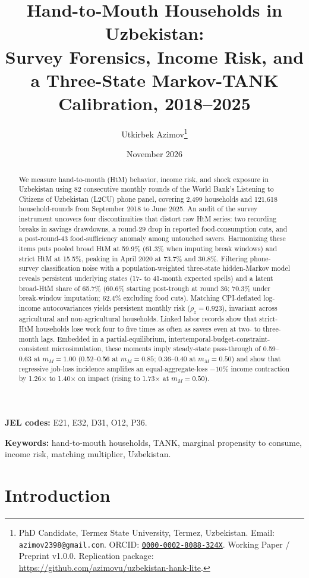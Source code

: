\documentclass[11pt]{article}
\title{Hand-to-Mouth Households in Uzbekistan:\\Survey Forensics, Income Risk, and a Three-State Markov-TANK Calibration, 2018--2025}
\author{Utkirbek Azimov\thanks{PhD Candidate, Termez State University, Termez, Uzbekistan. Email: \texttt{azimov2398@gmail.com}. ORCID: \href{https://orcid.org/0000-0002-8088-324X}{\texttt{0000-0002-8088-324X}}. Working Paper / Preprint v1.0.0. Replication package: \url{https://github.com/azimovu/uzbekistan-hank-lite}.}}
\date{November 2026}
\begin{document}
\maketitle
\vspace{-1.0em}

\begin{abstract}
We measure hand-to-mouth (HtM) behavior, income risk, and shock exposure in Uzbekistan using 82 consecutive monthly rounds of the World Bank's Listening to Citizens of Uzbekistan (L2CU) phone panel, covering 2,499 households and 121,618 household-rounds from September 2018 to June 2025. An audit of the survey instrument uncovers four discontinuities that distort raw HtM series: two recording breaks in savings drawdowns, a round-29 drop in reported food-consumption cuts, and a post-round-43 food-sufficiency anomaly among untouched savers. Harmonizing these items puts pooled broad HtM at 59.9\% (61.3\% when imputing break windows) and strict HtM at 15.5\%, peaking in April 2020 at 73.7\% and 30.8\%. Filtering phone-survey classification noise with a population-weighted three-state hidden-Markov model reveals persistent underlying states (17- to 41-month expected spells) and a latent broad-HtM share of 65.7\% (60.6\% starting post-trough at round 36; 70.3\% under break-window imputation; 62.4\% excluding food cuts). Matching CPI-deflated log-income autocovariances yields persistent monthly risk ($\rho_z = 0.923$), invariant across agricultural and non-agricultural households. Linked labor records show that strict-HtM households lose work four to five times as often as savers even at two- to three-month lags. Embedded in a partial-equilibrium, intertemporal-budget-constraint-consistent microsimulation, these moments imply steady-state pass-through of 0.59--0.63 at $m_M = 1.00$ (0.52--0.56 at $m_M = 0.85$; 0.36--0.40 at $m_M = 0.50$) and show that regressive job-loss incidence amplifies an equal-aggregate-loss $-10\%$ income contraction by 1.26$\times$ to 1.40$\times$ on impact (rising to 1.73$\times$ at $m_M = 0.50$).
\end{abstract}

\medskip\noindent
\textbf{JEL codes:} E21, E32, D31, O12, P36.

\medskip\noindent
\textbf{Keywords:} hand-to-mouth households, TANK, marginal propensity to consume, income risk, matching multiplier, Uzbekistan.

\section{Introduction}\label{sec:intro}
\end{document}

